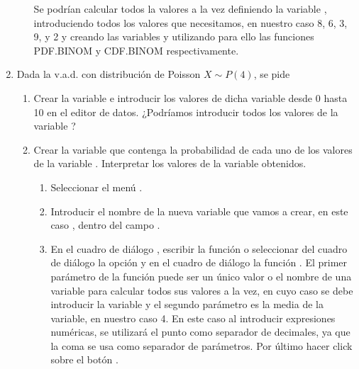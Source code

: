 \begin{enumerate}[leftmargin=*]
\begin{enumerate}
\begin{enumerate}
\end{enumerate}

\begin{indicacion}
Se podrían calcular todos la valores a la vez definiendo la
variable , introduciendo todos los valores que
necesitamos, en nuestro caso 8, 6, 3, 9, y 2 y creando las
variables  y 
utilizando para ello las funciones PDF.BINOM y CDF.BINOM
respectivamente.
\end{indicacion}
\end{enumerate}


\item Dada la v.a.d. con distribución de Poisson $X\sim P(4)$, se
pide

\begin{enumerate}
\item Crear la variable  e introducir los valores de
dicha variable desde 0 hasta 10 en el editor de datos. ¿Podríamos
introducir todos los valores de la variable ?

\item  Crear la variable  que contenga la
probabilidad de cada uno de los valores de la variable .
Interpretar los valores de la variable obtenidos.

\begin{indicacion}
\begin{enumerate}
\item Seleccionar el menú .

\item Introducir el nombre de la nueva variable que vamos a crear,
en este caso , dentro del campo
.

\item En el cuadro de diálogo ,
escribir la función  o seleccionar del cuadro 
de diálogo  la opción  y en el 
cuadro de diálogo  la 
función . El primer parámetro de la función 
 puede ser
un único valor o el nombre de una variable para calcular todos sus
valores a la vez, en cuyo caso se debe introducir la variable  
y el segundo parámetro es la media de la variable, en nuestro caso 4. En 
este caso al introducir expresiones numéricas, se utilizará el punto como
separador de decimales, ya que la coma se usa como separador de
parámetros. Por último hacer click sobre el botón
.



\end{enumerate}
\end{indicacion}
\end{enumerate}
\end{enumerate}
